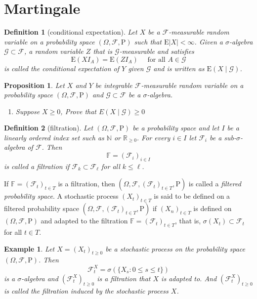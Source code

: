 \documentclass{article}
\newtheorem{definition}{Definition}[section]
\newtheorem{example}{Example}[section]
\newtheorem{proposition}{Proposition}[section]
\theoremstyle{nonumberplain}
\begin{document}
\section{Martingale}
\begin{definition}[conditional expectation]
	Let $X$ be a $\mathcal{F}$-measurable random variable on a probability space $(\Omega,\mathcal{F},\mathrm{P})$ such that $\mathrm{E}|X| < \infty$. Given a $\sigma$-algebra $\mathcal{G}\subset\mathcal{F}$, a random variable $Z$ that is $\mathcal{G}$-measurable and satisfies 
	\[
	\mathrm{E}(X I_A) = \mathrm{E}(ZI_A) \quad\text{ for all }A \in \mathcal{G}
	\] 
	is called the \emph{conditional expectation} of $Y$ given $\mathcal{G}$ and is written as $\mathrm{E}(X\mid\mathcal{G})$.
\end{definition}

\begin{proposition}
	Let $X$ and $Y$ be integrable $\mathcal{F}$-measurable random variable on a probability space $(\Omega,\mathcal{F},\mathrm{P})$ and  $\mathcal{G}\subset\mathcal{F}$ be a $\sigma$-algebra.
	\begin{enumerate}  
		\item  Suppose $X\geq0$, Prove that $E(X\mid\mathcal{G})\geq0$
	\end{enumerate}
\end{proposition}
\begin{definition}[filtration]
Let $(\Omega,\mathcal{F},\mathrm{P})$ be a probability space and let $I$ be a linearly ordered index set such as $\mathbb{N}$ or $\mathbb{R}_{\ge 0}$. For every $i\in I$ let $\mathcal{F}_{i}$ be a sub-$\sigma$-algebra of $\mathcal{F}$. Then
\[
\mathbb{F} =(\mathcal{F}_{i})_{i\in I}
\]
is called a \emph{filtration} if $\mathcal {F}_{k}\subset \mathcal{F}_{\ell}$ for all $k\leq \ell$. 
\end{definition}
If $ \mathbb {F}=(\mathcal{F}_{t})_{t\in T }$ is a filtration, then $(\Omega,\mathcal{F},(\mathcal{F}_{t})_{t\in T },\mathrm{P})$ is called a \emph{filtered probability space}. A stochastic process $(X_{t})_{t\in T }$ is said to be defined on a filtered probability space $(\Omega,\mathcal{F},(\mathcal{F}_{t})_{t\in T },\mathrm{P})$ if $(X_{n})_{t\in T }$ is defined on $(\Omega,\mathcal{F},\mathrm{P})$ and adapted to the filtration $\mathbb{F} =(\mathcal{F}_{t})_{t\in T }$, that is, $\sigma(X_t)\subset \mathcal{F}_t$ for all $t\in T$.

\begin{example}
	Let $X=(X_{t})_{t\ge 0}$ be a stochastic process on the probability space $(\Omega,\mathcal{F},\mathrm{P})$. Then 
	\[
	{\mathcal {F}}_{t}^X=\sigma (\{X_{s}:0\le s\le t\})
	\]
	is a $\sigma$-algebra and $(\mathcal {F}_{t}^X)_{t\ge0} $ is a filtration that $X$ is adapted to. And $(\mathcal {F}_{t}^X)_{t\ge0} $ is called the filtration induced by the stochastic process $X$.
\end{example}
\end{document}
